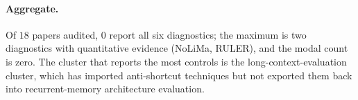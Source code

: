 \documentclass{article}
\begin{document}
\paragraph{Aggregate.}  Of $18$ papers audited, $0$ report all six
diagnostics; the maximum is two diagnostics with quantitative
evidence (NoLiMa, RULER), and the modal count is zero.  The cluster
that reports the most controls is the long-context-evaluation
cluster, which has imported anti-shortcut techniques but
not exported them back into recurrent-memory architecture
evaluation.
\end{document}
